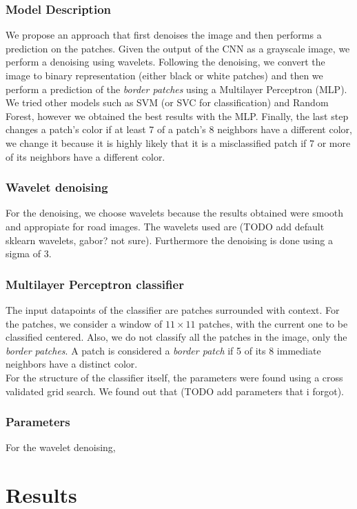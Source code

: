 \documentclass[10pt,conference,compsocconf]{IEEEtran}
\begin{document}
\subsubsection{Model Description}
We propose an approach that first denoises the image and then performs a prediction on the patches. Given the output of the CNN as a grayscale image, we perform a denoising using wavelets. Following the denoising, we convert the image to binary representation (either black or white patches) and then we perform a prediction of the \textit{border patches} using a Multilayer Perceptron (MLP). We tried other models such as SVM (or SVC for classification) and Random Forest, however we obtained the best results with the MLP. Finally, the last step changes a patch's color if at least 7 of a patch's 8 neighbors have a different color, we change it because it is highly likely that it is a misclassified patch if 7 or more of its neighbors have a different color.
\subsubsection{Wavelet denoising}
For the denoising, we choose wavelets because the results obtained were smooth and appropiate for road images. The wavelets used are (TODO add default sklearn wavelets, gabor? not sure). Furthermore the denoising is done using a sigma of 3. 
\subsubsection{Multilayer Perceptron classifier}
The input datapoints of the classifier are patches surrounded with context. For the patches, we consider a window of $11\times11$ patches, with the current one to be classified centered. Also, we do not classify all the patches in the image, only the \textit{border patches}. A patch is considered a \textit{border patch} if 5 of its 8 immediate neighbors have a distinct color.\\
For the structure of the classifier itself, the parameters were found using a cross validated grid search. We found out that (TODO add parameters that i forgot).
\subsubsection{Parameters}
For the wavelet denoising, 


\section{Results}
\label{sec:results}
\end{document}
